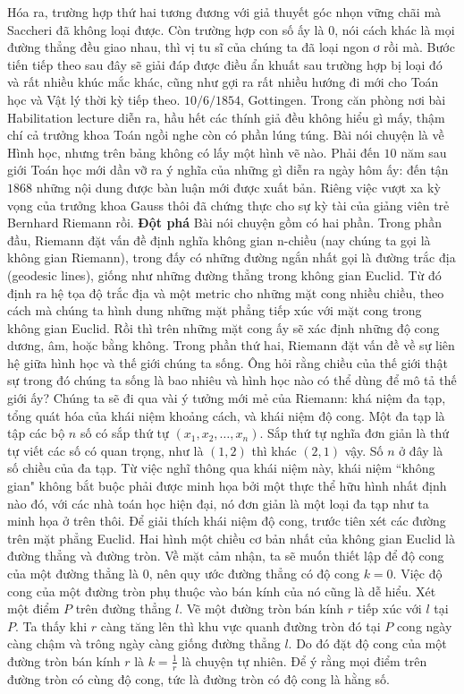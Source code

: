 \begin{multicols}{2}
	\vskip 0.1cm
	Hóa ra, trường hợp thứ hai tương đương với giả thuyết góc nhọn vững chãi mà Saccheri đã không loại được. Còn trường hợp con số ấy là $0$, nói cách khác là mọi đường thẳng đều giao nhau, thì vị tu sĩ của chúng ta đã loại ngon ơ rồi mà. 
	Bước tiến tiếp theo sau đây sẽ giải đáp được điều ẩn khuất sau trường hợp bị loại đó và rất nhiều khúc mắc khác, cũng như gợi ra rất nhiều hướng đi mới cho Toán học và Vật lý thời kỳ tiếp theo.  
	\vskip 0.1cm
	$10/6/1854$, Gottingen. Trong căn phòng nơi bài Habilitation lecture diễn ra, hầu hết các thính giả đều không hiểu gì mấy, thậm chí cả trưởng khoa Toán ngồi nghe còn có phần lúng túng. Bài nói chuyện là về Hình học, nhưng trên bảng không có lấy một hình vẽ nào. Phải đến $10$ năm sau giới Toán học mới dần vỡ ra ý nghĩa của những gì diễn ra ngày hôm ấy: đến tận $1868$ những nội dung được bàn luận mới được xuất bản. Riêng việc vượt xa kỳ vọng của trưởng khoa Gauss thôi đã chứng thực cho sự kỳ tài của giảng viên trẻ Bernhard Riemann rồi.
	\vskip 0.1cm
	\textbf{\color{lichsutoanhoc}Đột phá}
	\vskip 0.1cm
	Bài nói chuyện gồm có hai phần.
	Trong phần đầu, Riemann đặt vấn đề định nghĩa không gian n-chiều (nay chúng ta gọi là không gian Riemann), trong đấy có những đường ngắn nhất gọi là đường trắc địa (geodesic lines), giống như những đường thẳng trong không gian Euclid. Từ đó định ra hệ tọa độ trắc địa và một metric cho những mặt cong nhiều chiều, theo cách mà chúng ta hình dung những mặt phẳng tiếp xúc với mặt cong trong không gian Euclid. Rồi thì trên những mặt cong ấy sẽ xác định những độ cong dương, âm, hoặc bằng không.
	Trong phần thứ hai, Riemann đặt vấn đề về sự liên hệ giữa hình học và thế giới chúng ta sống. Ông hỏi rằng chiều của thế giới thật sự trong đó chúng ta sống là bao nhiêu và hình học nào có thể dùng để mô tả thế giới ấy?
	\vskip 0.1cm
	Chúng ta sẽ đi qua vài ý tưởng mới mẻ của Riemann: khá niệm đa tạp, tổng quát hóa của khái niệm khoảng cách, và khái niệm độ cong. 
	\vskip 0.1cm
	Một đa tạp là tập các bộ $n$ số có sắp thứ tự $(x_1, x_2, \ldots, x_n)$. Sắp thứ tự nghĩa đơn giản là thứ tự viết các số có quan trọng, như là $(1, 2)$ thì khác $(2, 1)$ vậy. Số $n$ ở đây là số chiều của đa tạp. Từ việc nghĩ thông qua khái niệm này, khái niệm ``không gian" không bắt buộc phải được minh họa bởi một thực thể hữu hình nhất định nào đó, với các nhà toán học hiện đại, nó đơn giản là một loại đa tạp như ta minh họa ở trên thôi. 
	\vskip 0.1cm
	Để giải thích khái niệm độ cong, trước tiên xét các đường trên mặt phẳng Euclid. Hai hình một chiều cơ bản nhất của không gian Euclid là đường thẳng và đường tròn. Về mặt cảm nhận, ta sẽ muốn thiết lập để độ cong của một đường thẳng là $0$, nên quy ước đường thẳng có độ cong $k = 0$. Việc độ cong của một đường tròn phụ thuộc vào bán kính của nó cũng là dễ hiểu. Xét một điểm $P$ trên đường thẳng $l$. Vẽ một đường tròn bán kính $r$ tiếp xúc với $l$ tại $P$. Ta thấy khi $r$ càng tăng lên thì khu vực quanh đường tròn đó tại $P$ cong ngày càng chậm và trông ngày càng giống đường thẳng $l$. Do đó đặt độ cong của một đường tròn bán kính $r$ là $k = \frac{1}{r}$ là chuyện tự nhiên. Để ý rằng mọi điểm trên đường tròn có cùng độ cong, tức là đường tròn có độ cong là hằng số.

\end{multicols}
